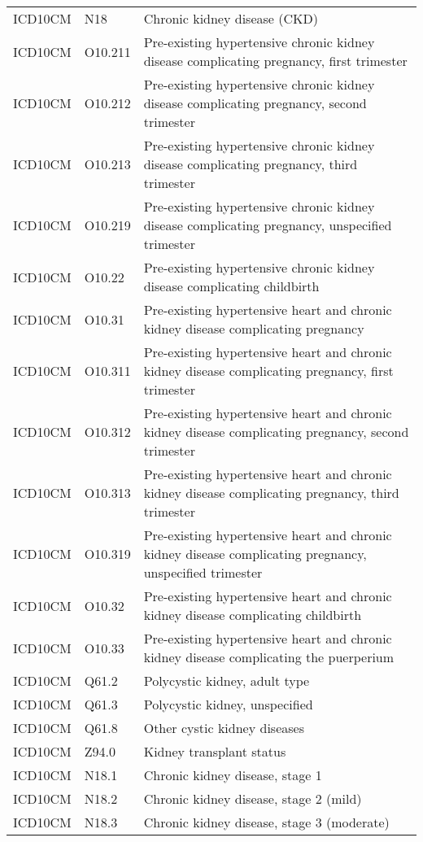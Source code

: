 \begin{longtable}{p{}p{}p{}}
  ICD10CM & N18 & Chronic kidney disease (CKD) \\ 
  ICD10CM & O10.211 & Pre-existing hypertensive chronic kidney disease complicating pregnancy, first trimester \\ 
  ICD10CM & O10.212 & Pre-existing hypertensive chronic kidney disease complicating pregnancy, second trimester \\ 
  ICD10CM & O10.213 & Pre-existing hypertensive chronic kidney disease complicating pregnancy, third trimester \\ 
  ICD10CM & O10.219 & Pre-existing hypertensive chronic kidney disease complicating pregnancy, unspecified trimester \\ 
  ICD10CM & O10.22 & Pre-existing hypertensive chronic kidney disease complicating childbirth \\ 
  ICD10CM & O10.31 & Pre-existing hypertensive heart and chronic kidney disease complicating pregnancy \\ 
  ICD10CM & O10.311 & Pre-existing hypertensive heart and chronic kidney disease complicating pregnancy, first trimester \\ 
  ICD10CM & O10.312 & Pre-existing hypertensive heart and chronic kidney disease complicating pregnancy, second trimester \\ 
  ICD10CM & O10.313 & Pre-existing hypertensive heart and chronic kidney disease complicating pregnancy, third trimester \\ 
  ICD10CM & O10.319 & Pre-existing hypertensive heart and chronic kidney disease complicating pregnancy, unspecified trimester \\ 
  ICD10CM & O10.32 & Pre-existing hypertensive heart and chronic kidney disease complicating childbirth \\ 
  ICD10CM & O10.33 & Pre-existing hypertensive heart and chronic kidney disease complicating the puerperium \\ 
  ICD10CM & Q61.2 & Polycystic kidney, adult type \\ 
  ICD10CM & Q61.3 & Polycystic kidney, unspecified \\ 
  ICD10CM & Q61.8 & Other cystic kidney diseases \\ 
  ICD10CM & Z94.0 & Kidney transplant status \\ 
  ICD10CM & N18.1 & Chronic kidney disease, stage 1 \\ 
  ICD10CM & N18.2 & Chronic kidney disease, stage 2 (mild) \\ 
  ICD10CM & N18.3 & Chronic kidney disease, stage 3 (moderate) \\ 

\end{longtable}
